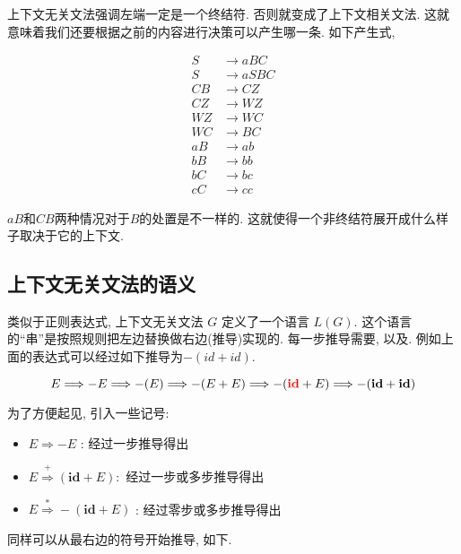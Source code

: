 \documentclass{ctexart}
\begin{document}

上下文无关文法强调左端一定是一个终结符. 否则就变成了上下文相关文法. 这就意味着我们还要根据之前的内容进行决策可以产生哪一条.  如下产生式, 

\begin{equation*}
    \begin{aligned}
    S & \rightarrow a B C \\
    S & \rightarrow a S B C \\
    C B & \rightarrow C Z \\
    C Z & \rightarrow W Z \\
    W Z & \rightarrow W C \\
    W C & \rightarrow B C \\
    a B & \rightarrow a b \\
    b B & \rightarrow b b \\
    b C & \rightarrow b c \\
    c C & \rightarrow c c
    \end{aligned}
\end{equation*}

$aB$和$CB$两种情况对于$B$的处置是不一样的. 这就使得一个非终结符展开成什么样子取决于它的上下文. 

\subsection{上下文无关文法的语义}


类似于正则表达式, 上下文无关文法 $G$ 定义了一个语言 $L(G)$. 这个语言的``串''是按照规则把左边替换做右边(推导)实现的. 每一步推导需要, 以及. 例如上面的表达式可以经过如下推导为$-(id+id)$.

$$
E \Longrightarrow-E \Longrightarrow-(E) \Longrightarrow-(E+E) \Longrightarrow-({{\color{red}\mathbf{i d}}}+E) \Longrightarrow-(\mathbf{i d}+\mathbf{i d})
$$

为了方便起见, 引入一些记号: 

\begin{itemize}
    \item $E \Longrightarrow-E$ : 经过一步推导得出
    \item $E \stackrel{+}{\Rightarrow} (\mathbf{i d}+E):$ 经过一步或多步推导得出
    \item $E \stackrel{*}{\Rightarrow}-(\mathbf{i d}+E)$ : 经过零步或多步推导得出
\end{itemize}

同样可以从最右边的符号开始推导, 如下. 
\end{document}
